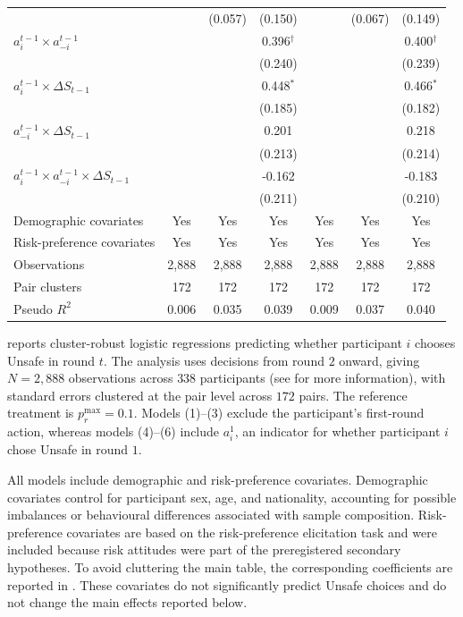 \documentclass[pdflatex,sn-mathphys-ay]{sn-jnl}
\theoremstyle{thmstyleone}
\theoremstyle{thmstyletwo}
\theoremstyle{thmstylethree}
\begin{document}
\begin{table}[t]
\begin{tabular}{lcccccc}
 &  & (0.057) & (0.150) &  & (0.067) & (0.149) \\
\(a_i^{t-1}\times a_{-i}^{t-1}\) &  &  & 0.396\(^{\dagger}\) &  &  & 0.400\(^{\dagger}\) \\
 &  &  & (0.240) &  &  & (0.239) \\
\(a_i^{t-1}\times \Delta S_{t-1}\) &  &  & 0.448\(^{*}\) &  &  & 0.466\(^{*}\) \\
 &  &  & (0.185) &  &  & (0.182) \\
\(a_{-i}^{t-1}\times \Delta S_{t-1}\) &  &  & 0.201 &  &  & 0.218 \\
 &  &  & (0.213) &  &  & (0.214) \\
\(a_i^{t-1}\times a_{-i}^{t-1}\times \Delta S_{t-1}\) &  &  & -0.162 &  &  & -0.183 \\
 &  &  & (0.211) &  &  & (0.210) \\
Demographic covariates & Yes & Yes & Yes & Yes & Yes & Yes \\
Risk-preference covariates & Yes & Yes & Yes & Yes & Yes & Yes \\
Observations & 2,888 & 2,888 & 2,888 & 2,888 & 2,888 & 2,888 \\
Pair clusters & 172 & 172 & 172 & 172 & 172 & 172 \\
Pseudo \(R^2\) & 0.006 & 0.035 & 0.039 & 0.009 & 0.037 & 0.040 \\
\bottomrule
\end{tabular}
\end{table}

 reports cluster-robust logistic regressions predicting whether participant $i$ chooses Unsafe in round $t$. The analysis uses decisions from round $2$ onward, giving $N=2{,}888$ observations across $338$ participants (see  for more information), with standard errors clustered at the pair level across $172$ pairs. The reference treatment is $p_r^{\max}=0.1$. Models (1)--(3) exclude the participant's first-round action, whereas models (4)--(6) include $a_i^1$, an indicator for whether participant $i$ chose Unsafe in round $1$.

All models include demographic and risk-preference covariates. Demographic covariates control for participant sex, age, and nationality, accounting for possible imbalances or behavioural differences associated with sample composition. Risk-preference covariates are based on the \cite{eckel2008forecastingRiskAttitudes} risk-preference elicitation task and were included because risk attitudes were part of the preregistered secondary hypotheses. To avoid cluttering the main table, the corresponding coefficients are reported in . These covariates do not significantly predict Unsafe choices and do not change the main effects reported below.
\end{document}
